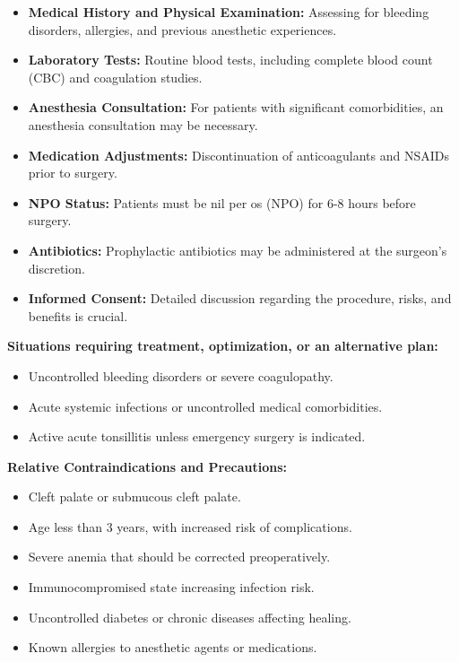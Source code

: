 \begin{itemize}
  \item \textbf{Medical History and Physical Examination:} Assessing for bleeding disorders, allergies, and previous anesthetic experiences.
  \item \textbf{Laboratory Tests:} Routine blood tests, including complete blood count (CBC) and coagulation studies.
  \item \textbf{Anesthesia Consultation:} For patients with significant comorbidities, an anesthesia consultation may be necessary.
  \item \textbf{Medication Adjustments:} Discontinuation of anticoagulants and NSAIDs prior to surgery.
  \item \textbf{NPO Status:} Patients must be nil per os (NPO) for 6-8 hours before surgery.
  \item \textbf{Antibiotics:} Prophylactic antibiotics may be administered at the surgeon's discretion.
  \item \textbf{Informed Consent:} Detailed discussion regarding the procedure, risks, and benefits is crucial.
\end{itemize}

\textbf{Situations requiring treatment, optimization, or an alternative plan:}
\begin{itemize}
  \item Uncontrolled bleeding disorders or severe coagulopathy.
  \item Acute systemic infections or uncontrolled medical comorbidities.
  \item Active acute tonsillitis unless emergency surgery is indicated.
\end{itemize}

\textbf{Relative Contraindications and Precautions:}
\begin{itemize}
  \item Cleft palate or submucous cleft palate.
  \item Age less than 3 years, with increased risk of complications.
  \item Severe anemia that should be corrected preoperatively.
  \item Immunocompromised state increasing infection risk.
  \item Uncontrolled diabetes or chronic diseases affecting healing.
  \item Known allergies to anesthetic agents or medications.
\end{itemize}

